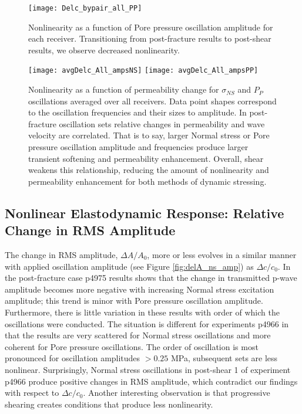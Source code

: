 \clearpage

\begin{figure*}[ht]
	\centering
	\texttt{[image: Delc\_bypair\_all\_PP]}
	\caption{Nonlinearity as a function of Pore pressure oscillation amplitude for each receiver. Transitioning from post-fracture results to post-shear results, we observe decreased nonlinearity.}
		\label{fig:delc_plots_pp}
\end{figure*}

\clearpage


\begin{figure*}[ht]
	\centering
	\texttt{[image: avgDelc\_All\_ampsNS]}
	\texttt{[image: avgDelc\_All\_ampsPP]}
	\caption{Nonlinearity as a function of permeability change for $ \sigma_{NS} $ and $ P_P $ oscillations averaged over all receivers. Data point shapes correspond to the oscillation frequencies and their sizes to amplitude. In post-fracture oscillation sets relative changes in permeability and wave velocity are correlated. That is to say, larger Normal stress or Pore pressure oscillation amplitude and frequencies produce larger transient softening and permeability enhancement. Overall, shear weakens this relationship, reducing the amount of nonlinearity and permeability enhancement for both methods of dynamic stressing. }
	\label{fig:delc_plots2}
\end{figure*}

\clearpage


\subsection{Nonlinear Elastodynamic Response: Relative Change in RMS Amplitude}
The change in RMS amplitude, $ \Delta A/ A_0 $, more or less evolves in a similar manner with applied oscillation amplitude (see Figure \ref{fig:delA_ns_amp}) as $ \Delta c/c_0 $. In the post-fracture case p4975 results shows that the change in transmitted p-wave amplitude becomes more negative with increasing Normal stress excitation amplitude; this trend is minor with Pore pressure oscillation amplitude. Furthermore, there is little variation in these results with order of which the oscillations were conducted. The situation is different for experiments p4966 in that the results are very scattered for Normal stress oscillations and more coherent for Pore pressure oscillations. The order of oscillation is most pronounced for oscillation amplitudes $ > 0.25 $ MPa, subsequent sets are less nonlinear. Surprisingly, Normal stress oscillations in post-shear 1 of experiment p4966 produce positive changes in RMS amplitude, which contradict our findings with respect to $ \Delta c/c_0 $. Another interesting observation is that progressive shearing creates conditions that produce less nonlinearity. 

